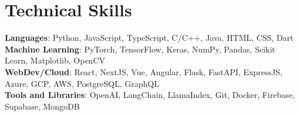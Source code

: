 \documentclass[letterpaper,11pt]{article}
\begin{document}
\section{Technical Skills}
 \begin{itemize}[leftmargin=0.15in, label={}]
    \small{\item{
     \textbf{Languages}{:  Python, JavaScript, TypeScript, C/C++, Java, HTML, CSS, Dart} \\
     \textbf{Machine Learning}{: PyTorch, TensorFlow, Keras, NumPy, Pandas, Scikit Learn, Matplotlib, OpenCV} \\
     \textbf{WebDev/Cloud}{: React, NextJS, Vue, Angular, Flask, FastAPI, ExpressJS, Azure, GCP, AWS, PostgreSQL, GraphQL} \\
     \textbf{Tools and Libraries}{: OpenAI, LangChain, LlamaIndex, Git, Docker, Firebase, Supabase, MongoDB}
    }}
 \end{itemize}


\end{document}
